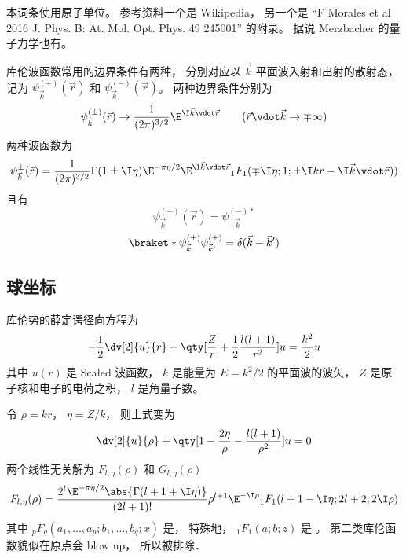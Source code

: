 
本词条使用原子单位。 参考资料一个是 Wikipedia， 另一个是 “F Morales et al 2016 J. Phys. B: At. Mol. Opt. Phys. 49 245001” 的附录。 据说 Merzbacher 的量子力学也有。

库伦波函数常用的边界条件有两种， 分别对应以 $\vec k$ 平面波入射和出射的散射态， 记为 $\psi_{\vec k}^{(+)}(\vec r)$ 和 $\psi_{\vec k}^{(-)}(\vec r)$。 两种边界条件分别为
\begin{equation}
\psi_{\vec k}^{(\pm)}(\vec r) \to \frac{1}{(2\pi)^{3/2}} \E^{\I\vec k\vdot\vec r}
\qquad
(\vec r\vdot \vec k \to \mp\infty)
\end{equation}
两种波函数为
\begin{equation}
\psi_{\vec k}^{\pm}(\vec r) = \frac{1}{(2\pi)^{3/2}} \Gamma(1\pm \I\eta)\E^{-\pi\eta/2} \E^{\I\vec k\vdot\vec r} {_1F_1}(\mp\I\eta; 1; \pm\I kr - \I \vec k\vdot \vec r))
\end{equation}
且有
\begin{equation}
\psi_{\vec k}^{(+)}(\vec r) = \psi_{-\vec k}^{(-)*}
\end{equation}
\begin{equation}
\braket*{\psi_{\vec k}^{(\pm)}}{\psi_{\vec k'}^{(\pm)}} = \delta(\vec k - \vec k')
\end{equation}

\subsection{球坐标}
库伦势的薛定谔径向方程为
\begin{equation}
-\frac12 \dv[2]{u}{r} + \qty[\frac{Z}{r} + \frac12 \frac{l(l+1)}{r^2}]u = \frac{k^2}{2}u
\end{equation}
其中 $u(r)$ 是 Scaled 波函数， $k$ 是能量为 $E = k^2/2$ 的平面波的波矢， $Z$ 是原子核和电子的电荷之积， $l$ 是角量子数。

令 $\rho = kr$， $\eta = Z/k$， 则上式变为
\begin{equation}
\dv[2]{u}{\rho} + \qty[1 - \frac{2\eta}{\rho} - \frac{l(l+1)}{\rho^2}]u = 0
\end{equation}
两个线性无关解为 $F_{l,\eta}(\rho)$ 和  $G_{l,\eta}(\rho)$
\begin{equation}
F_{l,\eta}(\rho) = \frac{2^l \E^{-\pi\eta/2} \abs{\Gamma(l+1+\I\eta)}}{(2l+1)!}
\rho^{l+1} \E^{-\I\rho} {_1F_1}(l+1-\I\eta; 2l+2; 2\I\rho)
\end{equation}
其中 $_p F_q(a_1,\dots,a_p; b_1,\dots,b_q; x)$ 是， 特殊地， $_1 F_1(a;b;z)$ 是 。 第二类库伦函数貌似在原点会 blow up， 所以被排除．

